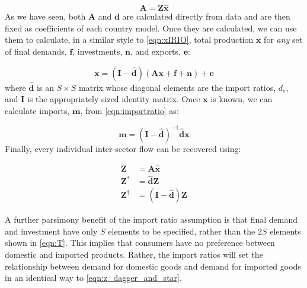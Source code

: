 \documentclass[a4paper]{article}
\begin{document}
\begin{equation}\label{eqn:a_combined}
    \boldsymbol{A} = \boldsymbol{Z} \boldsymbol{\hat{x}}
\end{equation}
As we have seen, both $\boldsymbol{A}$ and $\boldsymbol{d}$ are calculated directly from data and are then fixed as coefficients of each country model. Once they are calculated, we can use them to calculate, in a similar style to \cref{eqn:xIRIO}, total production $\boldsymbol{x}$ for \textit{any} set of final demands, $\boldsymbol{f}$, investments, $\boldsymbol{n}$, and exports, $\boldsymbol{e}$: 

\begin{equation}
    \boldsymbol{x} 
    = 
    (\boldsymbol{I} - \boldsymbol{\hat{d}})
    (
    \boldsymbol{Ax} + 
    \boldsymbol{f} + \boldsymbol{n}
    )
    + \boldsymbol{e}
    \label{eqn:xmodel}
\end{equation}
where $\boldsymbol{\hat{d}}$ is an $S \times S$ matrix whose diagonal elements are the import ratios, $d_s$, and $\boldsymbol{I}$ is the appropriately sized identity matrix.
Once $\boldsymbol{x}$ is known, we can calculate imports, $\boldsymbol{m}$, from \cref{eqn:importratio} as:

\begin{equation}
\boldsymbol{m} = 
(\boldsymbol{I} - 
\boldsymbol{\hat{d}})^{-1} 
\boldsymbol{\hat{d}}\boldsymbol{x}\label{eqn:mmodel}
\end{equation}
Finally, every individual inter-sector flow can be recovered using:

\begin{equation}\label{eqn:z_dagger_and_star}
    \begin{aligned}
        \boldsymbol{Z}& = \boldsymbol{A}\boldsymbol{\hat{x}} \\
        \boldsymbol{Z^*}& = \boldsymbol{\hat{d}}\boldsymbol{Z} \\
        \boldsymbol{Z^\dagger}& = (\boldsymbol{I} - \boldsymbol{\hat{d}}) \boldsymbol{Z}
    \end{aligned}
\end{equation}

A further parsimony benefit of the import ratio assumption is that final demand and investment have only $S$ elements to be specified, rather than the $2S$ elements shown in \cref{eqn:T}.
This implies that consumers have no preference between domestic and imported products.
Rather, the import ratios will set the relationship between demand for domestic goods and demand for imported goods in an identical way to \cref{eqn:z_dagger_and_star}.
\end{document}
